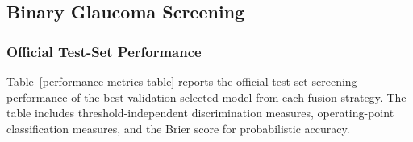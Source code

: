 \documentclass{ieeeaccess}
\begin{document}
\subsection{Binary Glaucoma Screening}
\label{subsec:screening_results}

\subsubsection{Official Test-Set Performance}
\label{subsubsec:screening_test_results}

Table~\ref{performance-metrics-table} reports the official test-set screening performance of the best validation-selected model from each fusion strategy. The table includes threshold-independent discrimination measures, operating-point classification measures, and the Brier score for probabilistic accuracy.

\begin{table}[htb]
    \centering
    \caption{Official test-set performance of the selected models for binary glaucoma screening.}
    \label{performance-metrics-table}
\end{table}
\end{document}

